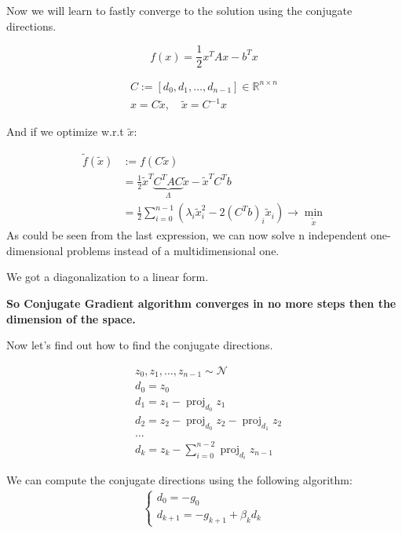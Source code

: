 Now we will learn to fastly converge to the solution using the conjugate directions.

\[ 
    f(x) = \frac{1}{2} x^T A x - b^T x 
\] 

\begin{gather*}
    C:= [d_0, d_1, \ldots, d_{n-1}] \in \mathbb{R}^{n \times n} \\ 
    x = C \tilde{x}, \quad \tilde{x} = C^{-1} x
\end{gather*}

And if we optimize w.r.t $\tilde{x}$: 

\begin{align*}
    \tilde{f}(\tilde{x}) &:= f(C \tilde{x}) \\ 
    &= \frac{1}{2} \tilde{x}^T \underbrace{C^T A C}_{\Lambda} \tilde{x} - \tilde{x}^T C^T b \\
    &= \frac{1}{2} \sum^{n-1}_{i=0} \left(\lambda_i \tilde{x}_i^2 - 2 (C^T b)_i \tilde{x}_i \right) \to \min_{\tilde{x}}
\end{align*}
As could be seen from the last expression, we can now solve n independent one-dimensional problems instead of a multidimensional one.

We got a diagonalization to a linear form.


\textbf{So Conjugate Gradient algorithm converges in no more steps then the dimension of the space.}

Now let's find out how to find the conjugate directions.

\begin{align*}
    &z_0, z_1, \ldots, z_{n-1} \sim \mathcal{N} \\ 
    &d_0 = z_0 \\ 
    &d_1 = z_1 - \operatorname{proj}_{d_0} z_1 \\
    &d_2 = z_2 - \operatorname{proj}_{d_0} z_2 - \operatorname{proj}_{d_1} z_2 \\
    &\ldots \\
    &d_k = z_k - \sum^{n-2}_{i=0} \operatorname{proj}_{d_i} z_{n - 1}
\end{align*}

We can compute the conjugate directions using the following algorithm:
\begin{gather*}
    \begin{cases}
        d_0 = -g_0 \\ 
        d_{k+1} = -g_{k+1} + \beta_k d_k
    \end{cases}
\end{gather*}

